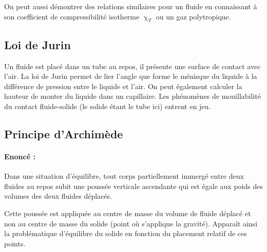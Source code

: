 On peut aussi démontrer des relations similaires pour un fluide en connaissant à son coefficient de compressibilité isotherme $\upchi_T$ ou un gaz polytropique.

\subsection{Loi de Jurin}
Un fluide est placé dans un tube au repos, il présente une surface de contact avec l'air. La loi de Jurin permet de lier l'angle que forme le ménisque du liquide à la différence de pression entre le liquide et l'air. On peut également calculer la hauteur de monter du liquide dans un capillaire. Les phénomènes de mouillabilité du contact fluide-solide (le solide étant le tube ici) entrent en jeu.

\subsection{Principe d'Archimède}
\paragraph{Enoncé :}Dans une situation d'équilibre, tout corps partiellement immergé entre deux fluides au repos subit une poussée verticale ascendante qui est égale aux poids des volumes des deux fluides déplacés\cite{amiroudine2014meéccanique}.

Cette poussée est appliquée au centre de masse du volume de fluide déplacé et non au centre de masse du solide (point où s'applique la gravité). Apparaît ainsi la problématique d'équilibre du solide en fonction du placement relatif de ces points.
